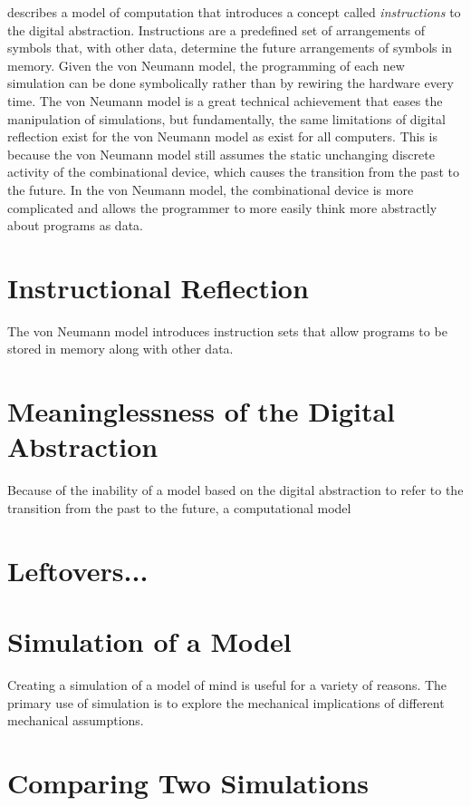 \cite{von_neumann:1945} describes a model of computation that
introduces a concept called \emph{instructions} to the digital
abstraction.  Instructions are a predefined set of arrangements of
symbols that, with other data, determine the future arrangements of
symbols in memory.  Given the von Neumann model, the programming of
each new simulation can be done symbolically rather than by rewiring
the hardware every time.  The von Neumann model is a great technical
achievement that eases the manipulation of simulations, but
fundamentally, the same limitations of digital reflection exist for
the von Neumann model as exist for all computers.  This is because the
von Neumann model still assumes the static unchanging discrete
activity of the combinational device, which causes the transition from
the past to the future.  In the von Neumann model, the combinational
device is more complicated and allows the programmer to more easily
think more abstractly about programs as data.

\section{Instructional Reflection}

The von Neumann model introduces instruction sets that allow programs
to be stored in memory along with other data.

\section{Meaninglessness of the Digital Abstraction}



Because of the inability of a model based on the digital abstraction
to refer to the transition from the past to the future, a
computational model

\section{Leftovers...}

\section{Simulation of a Model}

Creating a simulation of a model of mind is useful for a variety of
reasons.  The primary use of simulation is to explore the mechanical
implications of different mechanical assumptions.

\section{Comparing Two Simulations}

